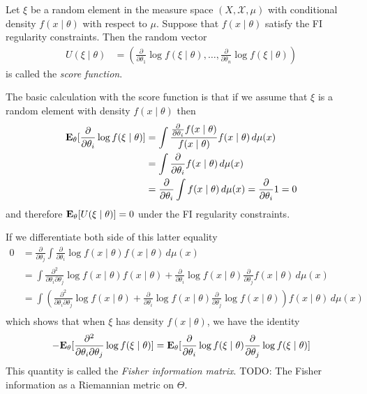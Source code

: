 \begin{defn}Let $\xi$ be a random element in the measure space $(X,
  \mathcal{X}, \mu)$ with conditional density
  $f(x \mid \theta)$ with respect to $\mu$.  Suppose that $f(x \mid
  \theta)$ satisfy the FI regularity constraints.  Then the random
  vector 
\begin{align*}
U(\xi \mid \theta) &= \left( \frac{\partial}{\partial \theta_1} \log f(\xi \mid \theta),
  \dots ,  \frac{\partial}{\partial \theta_n} \log f(\xi \mid \theta)\right)
\end{align*}
is called the \emph{score function}.
\end{defn}

The basic calculation with the score function is that if we assume
that $\xi$ is a random element with density $f(x \mid \theta)$ then
\begin{align*}
\textbf{E}_{\theta}[\frac{\partial}{\partial \theta_i} \log f(\xi \mid
  \theta)] &= \int \frac{\frac{\partial}{\partial \theta_i}  f(x \mid \theta)}{f(x \mid
  \theta)} f(x \mid \theta) \, d\mu(x) \\
&=\int \frac{\partial}{\partial \theta_i}  f(x \mid \theta) \, d\mu(x) \\
&=\frac{\partial}{\partial \theta_i}\int f(x \mid \theta) \, d\mu(x) =
\frac{\partial}{\partial \theta_i} 1 = 0
\end{align*}
and therefore $\textbf{E}_{\theta}[U(\xi \mid \theta)] = 0$ under
the FI regularity constraints.

If we differentiate both side of this latter equality 
\begin{align*}
0 &= \frac{\partial}{\partial \theta_j} \int \frac{\partial}{\partial
  \theta_i}\log f(x \mid  \theta) f(x \mid \theta) \, d\mu(x) \\
&=\int \frac{\partial^2}{\partial
  \theta_i\partial
  \theta_j}\log f(x \mid  \theta) f(x \mid \theta) + \frac{\partial}{\partial
  \theta_i}\log f(x \mid  \theta) \frac{\partial}{\partial
  \theta_j} f(x \mid  \theta)\, d\mu(x) \\
&=\int (\frac{\partial^2}{\partial
  \theta_i\partial
  \theta_j}\log f(x \mid  \theta) + \frac{\partial}{\partial
  \theta_i}\log f(x \mid  \theta) \frac{\partial}{\partial
  \theta_j} \log f(x \mid  \theta)) f(x \mid \theta)\, d\mu(x) \\
\end{align*}
which shows that when $\xi$ has density $f(x \mid \theta)$, we have
the identity
\begin{align*}
-\textbf{E}_{\theta}[\frac{\partial^2}{\partial
  \theta_i\partial
  \theta_j}\log f(\xi \mid  \theta) ] = \textbf{E}_{\theta}[\frac{\partial}{\partial
  \theta_i}\log f(\xi \mid  \theta) \frac{\partial}{\partial
  \theta_j} \log f(\xi \mid  \theta)]
\end{align*}
This quantity is called the \emph{Fisher information matrix}.   TODO:
The Fisher information as a Riemannian metric on $\Theta$.

